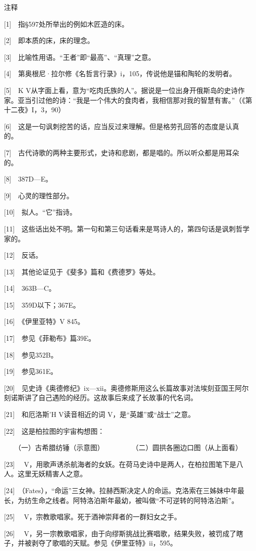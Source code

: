 \documentclass[12pt,oneside]{book}
\begin{document}
注释

[1]　指§597处所举出的例如木匠造的床。

[2]　即本质的床，床的理念。

[3]　比喻性用语。“王者”即“最高”、“真理”之意。

[4]　第奥根尼·拉尔修《名哲言行录》i，105，传说他是锚和陶轮的发明者。

[5]　K V从字面上看，意为“吃肉氏族的人”。据说是一位出身开俄斯岛的史诗作家。亚当引过他的诗：“我是一个伟大的食肉者，我相信那对我的智慧有害。”（《第十二夜》I，3，90）

[6]　这是一句讽刺挖苦的话，应当反过来理解。但是格劳孔回答的态度是认真的。

[7]　古代诗歌的两种主要形式，史诗和悲剧，都是唱的。所以听众都是用耳朵的。

[8]　387D—E。

[9]　心灵的理性部分。

[10]　拟人。“它”指诗。

[11]　这些话出处不明。第一句和第三句话看来是骂诗人的，第四句话是讽刺哲学家的。

[12]　反话。

[13]　其他论证见于《斐多》篇和《费德罗》等处。

[14]　363B—C。

[15]　359D以下；367E。

[16]　《伊里亚特》V 845。

[17]　参见《菲勒布》篇39E。

[18]　参见352B。

[19]　参见361E。

[20]　见史诗《奥德修纪》ix—xii。奥德修斯用这么长篇故事对法埃刻亚国王阿尔刻诺斯讲了自己遇险的经历。这故事后来成了长故事的代名词。

[21]　和厄洛斯’H V读音相近的词 V，是“英雄”或“战士”之意。

[22]　这是柏拉图的宇宙构想图：

　　（一）古希腊纺锤（示意图）　　　　　（二）圆拱各圈边口图（从上面看）

[23]　 V，用歌声诱杀航海者的女妖。在荷马史诗中是两人，在柏拉图笔下是八人。这里无妖精害人之意。

[24]　（Fates），“命运”三女神。拉赫西斯决定人的命运。克洛索在三姊妹中年最长，为纺生命之线者。阿特洛泊斯年最幼，被叫做“不可逆转的阿特洛泊斯”。

[25]　 V，宗教歌唱家。死于酒神崇拜者的一群妇女之手。

[26]　 V，另一宗教歌唱家，由于向缪斯挑战比赛唱歌，结果失败，被罚成了瞎子，并被剥夺了歌唱的天赋。参见《伊里亚特》ii，595。
\end{document}
